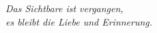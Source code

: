 \clearpage
\pagestyle{empty}
\vspace*{6cm}
\begin{flushright}
\Huge{\textit{Das Sichtbare ist vergangen,\\
es bleibt die Liebe und Erinnerung.}}
\end{flushright}

\clearpage
\pagestyle{plain}
